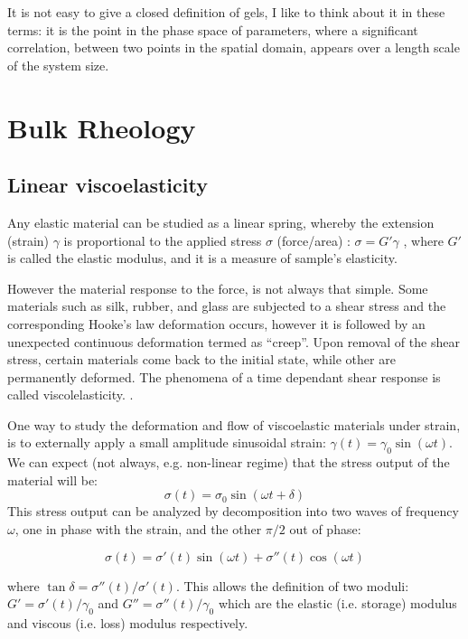 It is not easy to give a closed definition of
gels\citep{gennes_scaling_1979,rubinstein_polymer_2003}, I like to think about
it in these terms: it is the point in the phase space of parameters, where a significant correlation, between two points in the
spatial domain, appears over a length scale of the system size.

\section{Bulk Rheology}
\subsection{Linear viscoelasticity}
Any elastic material can be studied as a linear spring, whereby the
extension (strain) $\gamma$ is proportional to the applied stress $\sigma$ (force/area) :
$\sigma=G'\gamma$ , where $G'$ is called the elastic modulus, and it is a
measure of sample's elasticity.

However the material response to the force, is not always that simple. Some
materials such as silk, rubber, and glass are subjected to a shear
stress and the corresponding Hooke's law deformation occurs, however it is
followed by an unexpected continuous deformation termed as ``creep''. Upon
removal of the shear stress, certain materials come back to the initial state,
while other are permanently deformed. The phenomena of a time dependant shear
response is called viscolelasticity. \citep{macosko_rheology:_1994}.

One way to study the deformation and flow of viscoelastic materials under
strain, is to externally apply a small amplitude
sinusoidal strain:
$\gamma(t)=\gamma_0\sin(\omega t)$. We can expect (not always, e.g. non-linear
regime) that the stress output of the material will be:
\begin{equation}\label{viscoelastic-response}
\sigma(t) = \sigma_0 \sin(\omega t + \delta)
\end{equation}
This stress output can be
analyzed by decomposition into two waves of frequency $\omega$, one in phase
with the strain, and the other $\pi/2$ out of phase:

\begin{equation}\label{viscoelastic-stress}
\sigma(t) = \sigma'(t) \sin(\omega t) + \sigma''(t)\cos(\omega t)
\end{equation}

where $ \tan \delta=\sigma''(t)/\sigma'(t)$. This allows the definition of two
moduli: $G'=\sigma'(t)/\gamma_0$ and $G''=\sigma''(t)/\gamma_0$ which are the
elastic (i.e. storage) modulus and viscous (i.e. loss) modulus respectively.

